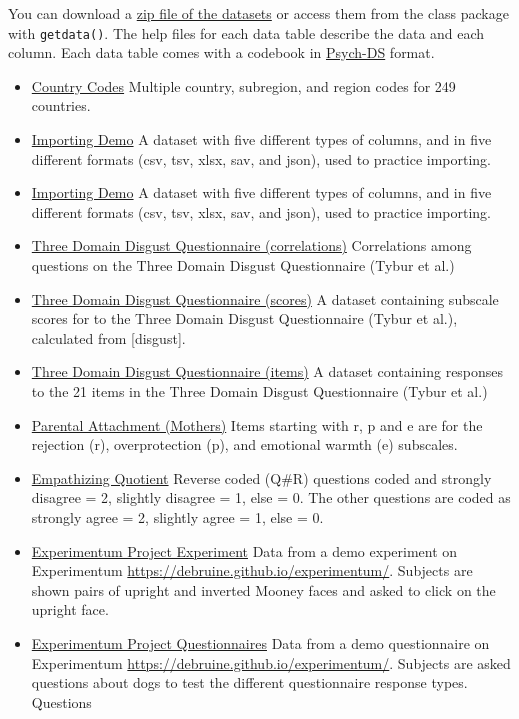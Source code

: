 \documentclass[
  oneside]{book}
\providecommand{\tightlist}{%
  \setlength{\itemsep}{0pt}\setlength{\parskip}{0pt}}
\begin{document}
You can download a \href{data/data.zip}{zip file of the datasets} or access them from the class package with \texttt{getdata()}. The help files for each data table describe the data and each column. Each data table comes with a codebook in \href{https://psych-ds.github.io/}{Psych-DS} format.

\begin{itemize}
\tightlist
\item
  \href{data/country_codes.csv}{Country Codes} Multiple country, subregion, and region codes for 249 countries.
\item
  \href{data/demo.csv}{Importing Demo} A dataset with five different types of columns, and in five different formats (csv, tsv, xlsx, sav, and json), used to practice importing.
\item
  \href{data/demo.xlsx}{Importing Demo} A dataset with five different types of columns, and in five different formats (csv, tsv, xlsx, sav, and json), used to practice importing.
\item
  \href{data/disgust_cors.csv}{Three Domain Disgust Questionnaire (correlations)} Correlations among questions on the Three Domain Disgust Questionnaire (Tybur et al.)
\item
  \href{data/disgust_scores.csv}{Three Domain Disgust Questionnaire (scores)} A dataset containing subscale scores for to the Three Domain Disgust Questionnaire (Tybur et al.), calculated from {[}disgust{]}.
\item
  \href{data/disgust.csv}{Three Domain Disgust Questionnaire (items)} A dataset containing responses to the 21 items in the Three Domain Disgust Questionnaire (Tybur et al.)
\item
  \href{data/EMBU_mother.csv}{Parental Attachment (Mothers)} Items starting with r, p and e are for the rejection (r), overprotection (p), and emotional warmth (e) subscales.
\item
  \href{data/eq_data.csv}{Empathizing Quotient} Reverse coded (Q\#R) questions coded and strongly disagree = 2, slightly disagree = 1, else = 0. The other questions are coded as strongly agree = 2, slightly agree = 1, else = 0.
\item
  \href{data/experimentum_exps.csv}{Experimentum Project Experiment} Data from a demo experiment on Experimentum \url{https://debruine.github.io/experimentum/}. Subjects are shown pairs of upright and inverted Mooney faces and asked to click on the upright face.
\item
  \href{data/experimentum_quests.csv}{Experimentum Project Questionnaires} Data from a demo questionnaire on Experimentum \url{https://debruine.github.io/experimentum/}. Subjects are asked questions about dogs to test the different questionnaire response types. Questions


\end{itemize}
\end{document}
